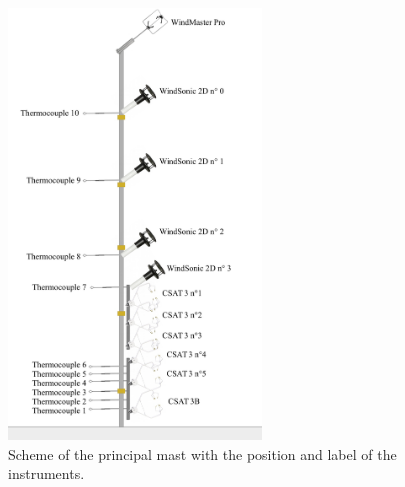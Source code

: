 \begin{figure}[!ht]
  \begin{center}
  \includegraphics[width=0.6\textwidth]{fig/chapter_3/Montage.jpg}
  \caption{Scheme of the principal mast with the position and label of the instruments.}
  \label{fig:mast}
  \end{center}
\end{figure}

